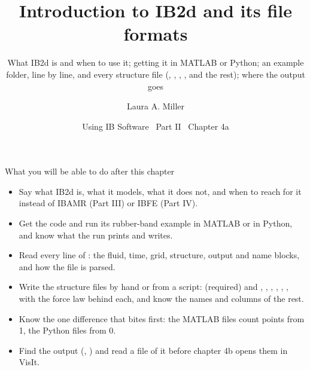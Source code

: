 \documentclass[aspectratio=169,11pt]{beamer}
\title[IB2d: introduction and file formats]{Introduction to IB2d and its file formats}
\subtitle{What IB2d is and when to use it; getting it in MATLAB or Python; an example folder, \code{input2d} line by line, and every structure file (\code{.vertex}, \code{.spring}, \code{.beam}, \code{.target}, \code{.mass} and the rest); where the output goes}
\author[Miller]{Laura A. Miller}
\institute[UArizona]{Department of Mathematics, University of Arizona}
\date{Using IB Software \textbullet\ Part II \textbullet\ Chapter 4a}
\begin{document}
\begin{frame}[plain]
\end{frame}

\begin{frame}{What you will be able to do after this chapter}
\label{fr:goals}
\begin{itemize}
  \item Say what IB2d is, what it models, what it does not, and when to reach for it instead of IBAMR (Part III) or IBFE (Part IV).
  \item Get the code and run its rubber-band example in MATLAB or in Python, and know what the run prints and writes.
  \item Read every line of : the fluid, time, grid, structure, output and name blocks, and how the file is parsed.
  \item Write the structure files by hand or from a script:  (required) and , , , , , , with the force law behind each, and know the names and columns of the rest.
  \item Know the one difference that bites first: the MATLAB files count points from 1, the Python files from 0.
  \item Find the output (, ) and read a file of it before chapter 4b opens them in VisIt.
\end{itemize}
\end{frame}
\end{document}
